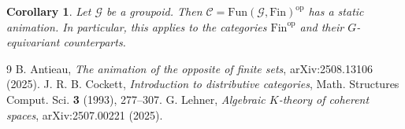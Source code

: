 \documentclass[11pt, oneside]{amsart}       %
\newtheorem{corollary}[theorem]{Corollary}
\theoremstyle{remark}
\newcommand{\cC}{\mathscr{C}}
\newcommand{\fnt}{\mathrm{Fin}}
\begin{document}
\begin{corollary} Let $\mathcal{G}$ be a groupoid. Then $\cC=\mathrm{Fun}(\mathcal{G},\fnt)^{\mathrm{op}}$ has a static animation. In particular, this applies to the categories $\fnt^{\mathrm{op}}$ and their $G$-equivariant counterparts. \end{corollary}





\begin{thebibliography}{9}
 B. Antieau, \emph{The animation of the opposite of finite sets}, arXiv:2508.13106 (2025).
 J. R. B. Cockett, \emph{Introduction to distributive categories}, Math. Structures Comput. Sci. \textbf{3} (1993), 277--307.
 G. Lehner, \emph{Algebraic $K$-theory of coherent spaces}, arXiv:2507.00221 (2025).

\end{thebibliography}
\end{document}
